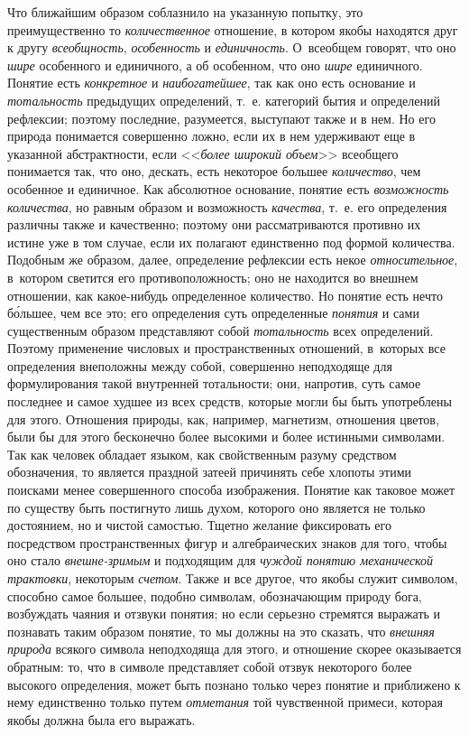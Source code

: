 Что ближайшим образом соблазнило на указанную попытку, это
преимущественно то {\em количественное}
отношение, в котором якобы находятся друг к другу
{\em всеобщность}, {\em особенность} и {\em единичность}.
О~всеобщем говорят, что оно {\em шире}
особенного и единичного, а об особенном, что оно
{\em шире} единичного. Понятие есть {\em конкретное}
и {\em наибогатейшее}, так как оно есть основание и {\em тотальность}
предыдущих определений, т.~е. категорий бытия и определений
рефлексии; поэтому последние, разумеется, выступают также и в нем. Но его
природа понимается совершенно ложно, если их в нем удерживают еще в
указанной абстрактности, если <<{\em более широкий объем}>>
всеобщего понимается так, что оно, дескать, есть некоторое
большее {\em количество}, чем особенное и единичное. Как абсолютное
основание, понятие есть {\em возможность количества},
но равным образом и возможность {\em качества}, т.~е. его
определения различны также и качественно; поэтому они рассматриваются
противно их истине уже в том случае, если их полагают единственно под
формой количества. Подобным же образом, далее, определение рефлексии есть
некое {\em относительное},
в~котором светится его противоположность; оно не находится во
внешнем отношении, как какое-нибудь определенное количество. Но понятие
есть нечто б\'{о}льшее, чем все это; его определения суть определенные
{\em понятия} и сами существенным образом представляют собой {\em тотальность}
всех определений. Поэтому применение числовых и пространственных отношений,
в~которых все определения внеположны между собой, совершенно неподходяще для
формулирования такой внутренней тотальности; они, напротив, суть самое
последнее и самое худшее из всех средств, которые могли бы быть употреблены
для этого. Отношения природы, как, например, магнетизм, отношения цветов,
были бы для этого бесконечно более высокими и более истинными символами.
Так как человек обладает языком, как свойственным разуму средством
обозначения, то является праздной затеей причинять себе
хлопоты этими поисками менее совершенного способа изображения. Понятие как
таковое может по существу быть постигнуто лишь духом, которого оно является
не только достоянием, но и чистой самостью. Тщетно желание фиксировать его
посредством пространственных фигур и алгебраических знаков для того, чтобы
оно стало {\em внешне-зримым} и подходящим для {\em чуждой понятию
механической трактовки}, некоторым {\em счетом}. Также и все
другое, что якобы служит символом, способно самое большее, подобно
символам, обозначающим природу бога, возбуждать чаяния и отзвуки понятия;
но если серьезно стремятся выражать и познавать таким образом понятие, то
мы должны на это сказать, что {\em внешняя природа}
всякого символа неподходяща для этого, и отношение скорее
оказывается обратным: то, что в символе представляет собой отзвук
некоторого более высокого определения, может быть познано только через
понятие и приближено к нему единственно только путем {\em отметания} той
чувственной примеси, которая якобы должна была его выражать.

